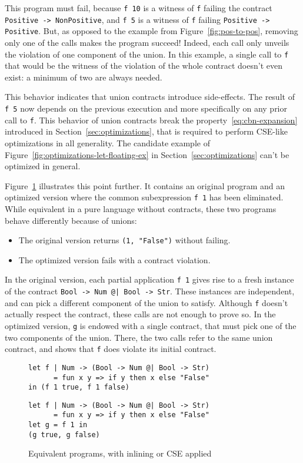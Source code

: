 \documentclass[sigplan,10pt,review,anonymous]{acmart}
\newcommand{\nickel}[1]{\lstinline[language=nickel]{#1}}
\begin{document}
This program must fail, because \nickel{f 10} is a witness of \nickel{f} failing
the contract \nickel{Positive -> NonPositive}, and \nickel{f 5} is a witness of
\nickel{f} failing \nickel{Positive -> Positive}.  But, as opposed to the
example from Figure~\ref{fig:pos-to-pos}, removing only one of the calls makes the
program succeed! Indeed, each call only unveils the violation of one component
of the union. In this example, a single call to \nickel{f} that would be the
witness of the violation of the whole contract doesn't even exist: a minimum of
two are always needed.

This behavior indicates that union contracts introduce side-effects. The result
of \nickel{f 5} now depends on the previous execution and more specifically on
any prior call to \nickel{f}. This behavior of union contracts break the
property~\ref{eq:cbn-expansion} introduced in Section~\ref{sec:optimizations},
that is required to perform CSE-like optimizations in all generality. The
candidate example of Figure~\ref{fig:optimizations-let-floating-ex} in
Section~\ref{sec:optimizations} can't be optimized in general.

Figure~\ref{fig:optimized-programs} illustrates this point further. It contains
an original program and an optimized version where the common subexpression
\nickel{f 1} has been eliminated. While equivalent in a pure language without
contracts, these two programs behave differently because of unions:

\begin{itemize}
    \item The original version returns \nickel{(1, "False")} without failing.
    \item The optimized version fails with a contract violation.
\end{itemize}

In the original version, each partial application \nickel{f 1} gives rise to a
fresh instance of the contract \nickel{Bool -> Num @| Bool -> Str}. These
instances are independent, and can pick a different component of the union to
satisfy. Although \nickel{f} doesn't actually respect the contract, these calls
are not enough to prove so. In the optimized version, \nickel{g} is endowed with
a single contract, that must pick one of the two components of the union. There,
the two calls refer to the same union contract, and shows that \nickel{f} does
violate its initial contract.

\begin{figure}[h]
\begin{lstlisting}[language=nickel, title=Original]
let f | Num -> (Bool -> Num @| Bool -> Str)
      = fun x y => if y then x else "False"
in (f 1 true, f 1 false)
\end{lstlisting}
\begin{lstlisting}[language=nickel, title=Optimized]
let f | Num -> (Bool -> Num @| Bool -> Str)
      = fun x y => if y then x else "False"
let g = f 1 in
(g true, g false)
\end{lstlisting}
\caption{Equivalent programs, with inlining or CSE applied}
\label{fig:optimized-programs}
\end{figure}
\end{document}
